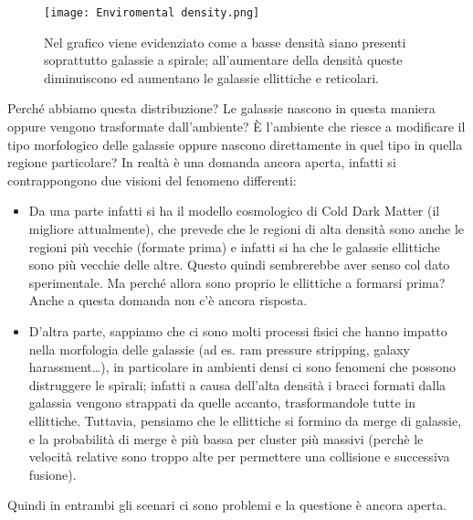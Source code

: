 \begin{figure}[!htb]
    \centering
    \texttt{[image: Enviromental density.png]}
    \caption{Nel grafico viene evidenziato come a basse densità siano presenti soprattutto galassie a spirale; all'aumentare della densità queste diminuiscono ed aumentano le galassie ellittiche e reticolari.}
    \label{fig:grafico-densità-morfologia}
\end{figure}

Perché abbiamo questa distribuzione? Le galassie nascono in questa maniera oppure vengono trasformate dall’ambiente? È l’ambiente che riesce a modificare il tipo morfologico delle galassie oppure nascono direttamente in quel tipo in quella regione particolare? In realtà è una domanda ancora aperta, infatti si contrappongono due visioni del fenomeno differenti:

\begin{itemize}
    \item Da una parte infatti si ha il modello cosmologico di Cold Dark Matter (il migliore attualmente), che prevede che le regioni di alta densità sono anche le regioni più vecchie (formate prima) e infatti si ha che le galassie ellittiche sono più vecchie delle altre. Questo quindi sembrerebbe aver senso col dato sperimentale. Ma perché allora sono proprio le ellittiche a formarsi prima? Anche a questa domanda non c’è ancora risposta.
    \item D’altra parte, sappiamo che ci sono molti processi fisici che hanno impatto nella morfologia delle galassie (ad es. ram pressure stripping, galaxy harassment…), in particolare in ambienti densi ci sono fenomeni che possono distruggere le spirali; infatti a causa dell'alta densità i bracci formati dalla galassia vengono strappati da quelle accanto, trasformandole tutte in ellittiche. Tuttavia, pensiamo che le ellittiche si formino da merge di galassie, e la probabilità di merge è più bassa per cluster più massivi (perchè le velocità relative sono troppo alte per permettere una collisione e successiva fusione).
\end{itemize} 

Quindi in entrambi gli scenari ci sono problemi e la questione è ancora aperta.